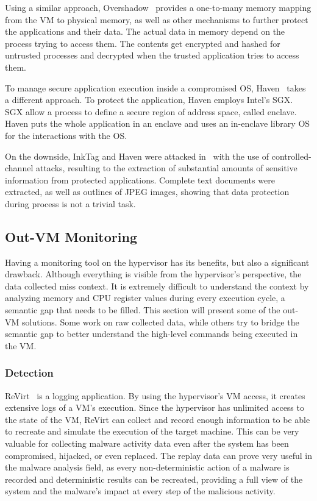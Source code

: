 \par Using a similar approach, Overshadow~\cite{chen2008overshadow} provides a one-to-many memory mapping from the \ac{VM} to physical memory, as well as other mechanisms to further protect the applications and their data. The actual data in memory depend on the process trying to access them. The contents get encrypted and hashed for untrusted processes and decrypted when the trusted application tries to access them. 

\par To manage secure application execution inside a compromised \ac{OS}, Haven~\cite{baumann2015shielding} takes a different approach. To protect the application, Haven employs Intel's \ac{SGX}. \ac{SGX} allow a process to define a secure region of address space, called enclave. Haven puts the whole application in an enclave and uses an in-enclave library \ac{OS} for the interactions with the \ac{OS}.

\par On the downside, InkTag and Haven were attacked in~\cite{xu2015controlled} with the use of controlled-channel attacks, resulting to the extraction of substantial amounts of sensitive information from protected applications. Complete text documents were extracted, as well as outlines of JPEG images, showing that data protection during process is not a trivial task. 


\subsection{Out-\ac{VM} Monitoring}\label{sub:outvm}
Having a monitoring tool on the hypervisor has its benefits, but also a significant drawback. Although everything is visible from the hypervisor's perspective, the data collected miss context. It is extremely difficult to understand the context by analyzing memory and \ac{CPU} register values during every execution cycle, a semantic gap that needs to be filled. This section will present some of the out-\ac{VM} solutions. Some work on raw collected data, while others try to bridge the semantic gap to better understand the high-level commands being executed in the \ac{VM}.

\subsubsection{Detection}

\par ReVirt~\cite{dunlap2002revirt} is a logging application. By using the hypervisor’s \ac{VM} access, it creates extensive logs of a \ac{VM}’s execution. Since the hypervisor has unlimited access to the state of the \ac{VM}, ReVirt can collect and record enough information to be able to recreate and simulate the execution of the target machine. This can be very valuable for collecting malware activity data even after the system has been compromised, hijacked, or even replaced. The replay data can prove very useful in the malware analysis field, as every non-deterministic action of a malware is recorded and deterministic results can be recreated, providing a full view of the system and the malware's impact at every step of the malicious activity.

